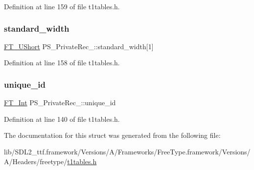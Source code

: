 Definition at line 159 of file t1tables.\+h.

\mbox{\label{struct_p_s___private_rec___a1c8ae2204e63c22b7702446720ed50a3}} 
\subsubsection{\texorpdfstring{standard\_width}{standard\_width}}
{\footnotesize\ttfamily \mbox{\hyperlink{fttypes_8h_a937f6c17cf5ffd09086d8610c37b9f58}{F\+T\+\_\+\+U\+Short}} P\+S\+\_\+\+Private\+Rec\+\_\+\+::standard\+\_\+width\mbox{[}1\mbox{]}}



Definition at line 158 of file t1tables.\+h.

\mbox{\label{struct_p_s___private_rec___ae862c1db170cfee85aa3242be9fa5d57}} 
\subsubsection{\texorpdfstring{unique\_id}{unique\_id}}
{\footnotesize\ttfamily \mbox{\hyperlink{fttypes_8h_af90e5fb0d07e21be9fe6faa33f02484c}{F\+T\+\_\+\+Int}} P\+S\+\_\+\+Private\+Rec\+\_\+\+::unique\+\_\+id}



Definition at line 140 of file t1tables.\+h.



The documentation for this struct was generated from the following file\+:\begin{DoxyCompactItemize}
\item 
lib/\+S\+D\+L2\+\_\+ttf.\+framework/\+Versions/\+A/\+Frameworks/\+Free\+Type.\+framework/\+Versions/\+A/\+Headers/freetype/\mbox{\hyperlink{t1tables_8h}{t1tables.\+h}}\end{DoxyCompactItemize}
